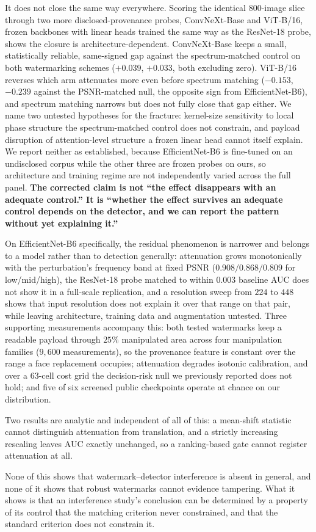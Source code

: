 \documentclass[journal]{IEEEtran}
\begin{document}
It does not close the same way everywhere. Scoring the identical $800$-image
slice through two more disclosed-provenance probes, ConvNeXt-Base and
ViT-B/16, frozen backbones with linear heads trained the same way as the
ResNet-18 probe, shows the closure is architecture-dependent. ConvNeXt-Base
keeps a small, statistically reliable, same-signed gap against the
spectrum-matched control on both watermarking schemes ($+0.039$, $+0.033$,
both excluding zero). ViT-B/16 reverses which arm attenuates more even before
spectrum matching ($-0.153$, $-0.239$ against the PSNR-matched null, the
opposite sign from EfficientNet-B6), and spectrum matching narrows but does
not fully close that gap either. We name two untested hypotheses for the
fracture: kernel-size sensitivity to local phase structure the
spectrum-matched control does not constrain, and payload disruption of
attention-level structure a frozen linear head cannot itself explain. We
report neither as established, because EfficientNet-B6 is fine-tuned on an
undisclosed corpus while the other three are frozen probes on ours, so
architecture and training regime are not independently varied across the full
panel. \textbf{The corrected claim is not ``the effect disappears with an
adequate control.'' It is ``whether the effect survives an adequate control
depends on the detector, and we can report the pattern without yet explaining
it.''}

On EfficientNet-B6 specifically, the residual phenomenon is narrower and
belongs to a model rather than to detection generally: attenuation grows
monotonically with the perturbation's frequency band at fixed PSNR
($0.908/0.868/0.809$ for low/mid/high), the ResNet-18 probe matched to within
$0.003$ baseline AUC does not show it in a full-scale replication, and a
resolution sweep from $224$ to $448$ shows that input resolution does not
explain it over that range on that pair, while leaving architecture, training
data and augmentation untested. Three supporting measurements accompany this:
both tested watermarks keep a readable payload through $25\%$ manipulated area
across four manipulation families ($9{,}600$ measurements), so the provenance
feature is constant over the range a face replacement occupies; attenuation
degrades isotonic calibration, and over a $63$-cell cost grid the decision-risk
null we previously reported does not hold; and five of six screened public
checkpoints operate at chance on our distribution.

Two results are analytic and independent of all of this: a mean-shift statistic
cannot distinguish attenuation from translation, and a strictly increasing
rescaling leaves AUC exactly unchanged, so a ranking-based gate cannot
register attenuation at all.

None of this shows that watermark--detector interference is absent in
general, and none of it shows that robust watermarks cannot evidence
tampering. What it shows is that an interference study's conclusion can be
determined by a property of its control that the matching criterion never
constrained, and that the standard criterion does not constrain it.

{\footnotesize

}
\end{document}
